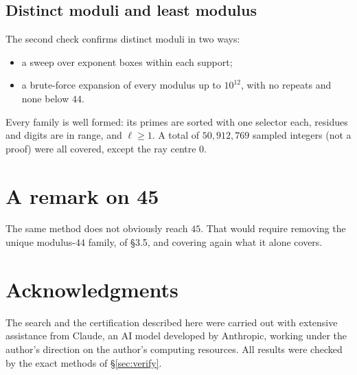 \documentclass[11pt]{amsart}
\theoremstyle{definition}
\theoremstyle{remark}
\begin{document}
\subsection*{Distinct moduli and least modulus}
The second check confirms distinct moduli in two ways:
\begin{itemize}
\item a sweep over exponent boxes within each support;
\item a brute-force expansion of every modulus up to $10^{12}$, with no repeats and none below $44$.
\end{itemize}
Every family is well formed: its primes are sorted with one selector each, residues and digits are in range, and
$\ell\ge1$. A total of $50{,}912{,}769$ sampled integers (not a proof) were all covered, except the ray centre $0$.

\section{A remark on 45}\label{sec:beyond}

The same method does not obviously reach $45$. That would require removing the unique modulus-$44$ family, of §3.5,
and covering again what it alone covers.

\section*{Acknowledgments}
The search and the certification described here were carried out with extensive assistance from
Claude, an AI model developed by Anthropic, working under the author's direction on the author's computing
resources. All results were checked by the exact methods of §\ref{sec:verify}.
\end{document}
